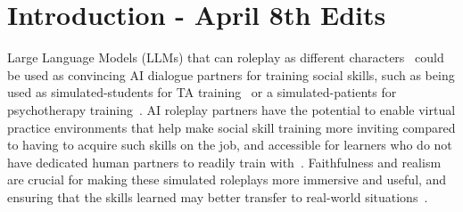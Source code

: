 \section{Introduction - April 8th Edits}


Large Language Models (LLMs) that can roleplay as different characters~\citep{park2022social, park2023generative} could be used as convincing AI dialogue partners for training social skills, such as being used as simulated-students for TA training~\citep{markel_opferman_landay_piech_2023} or a simulated-patients for psychotherapy training~\citep{chen2023llmempowered}. 
AI roleplay partners have the potential to enable virtual practice environments that help make social skill training more inviting compared to having to acquire such skills on the job, and accessible for learners who do not have dedicated human partners to readily train with~\citep{yang2024social}. Faithfulness and realism are crucial for making these simulated roleplays more immersive and useful, and ensuring that the skills learned may better transfer to real-world situations~\cite{alinier2022simulation}. 

